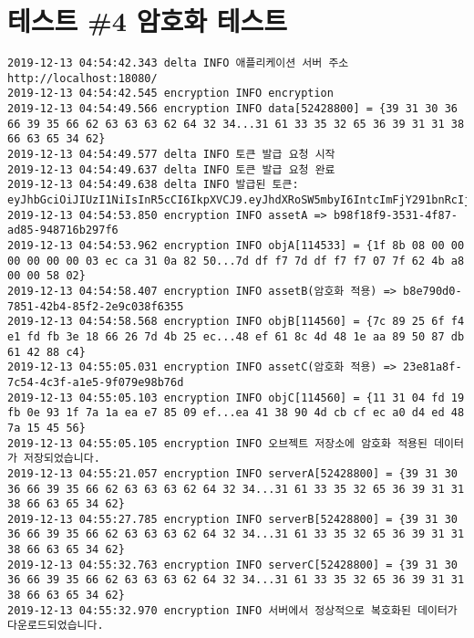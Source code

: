 \section{테스트 \#4 암호화 테스트}
\begin{Verbatim}[fontsize=\tiny, breaklines=true, breakanywhere=true]
2019-12-13 04:54:42.343 delta INFO 애플리케이션 서버 주소 http://localhost:18080/
2019-12-13 04:54:42.545 encryption INFO encryption
2019-12-13 04:54:49.566 encryption INFO data[52428800] = {39 31 30 36 66 39 35 66 62 63 63 63 62 64 32 34...31 61 33 35 32 65 36 39 31 31 38 66 63 65 34 62}
2019-12-13 04:54:49.577 delta INFO 토큰 발급 요청 시작
2019-12-13 04:54:49.637 delta INFO 토큰 발급 요청 완료
2019-12-13 04:54:49.638 delta INFO 발급된 토큰: eyJhbGciOiJIUzI1NiIsInR5cCI6IkpXVCJ9.eyJhdXRoSW5mbyI6IntcImFjY291bnRcIjp7XCJpZFwiOjEsXCJ1c2VybmFtZVwiOlwiRGVmYXVsdEFkbWluVXNlclwifSxcInJvbGVcIjpcIkFkbWluXCJ9IiwianRpIjoiMmNjNGVkZTVkMDk4NWJjNTkwYzAxYTlmZDcxNDQ3ODYyZDU3NzM2NjBlODNmMzgzYjA3Y2EyM2I5OWNkYmU1OSIsImlzcyI6IkRlbHRhLkFwcFNlcnZlciIsImF1ZCI6IkRlbHRhLkFwcFNlcnZlciJ9.eJ1rJKCuK_haDdI2jcUgsmyyWrU1CXdaylb6bsuPcRc
2019-12-13 04:54:53.850 encryption INFO assetA => b98f18f9-3531-4f87-ad85-948716b297f6
2019-12-13 04:54:53.962 encryption INFO objA[114533] = {1f 8b 08 00 00 00 00 00 00 03 ec ca 31 0a 82 50...7d df f7 7d df f7 f7 07 7f 62 4b a8 00 00 58 02}
2019-12-13 04:54:58.407 encryption INFO assetB(암호화 적용) => b8e790d0-7851-42b4-85f2-2e9c038f6355
2019-12-13 04:54:58.568 encryption INFO objB[114560] = {7c 89 25 6f f4 e1 fd fb 3e 18 66 26 7d 4b 25 ec...48 ef 61 8c 4d 48 1e aa 89 50 87 db 61 42 88 c4}
2019-12-13 04:55:05.031 encryption INFO assetC(암호화 적용) => 23e81a8f-7c54-4c3f-a1e5-9f079e98b76d
2019-12-13 04:55:05.103 encryption INFO objC[114560] = {11 31 04 fd 19 fb 0e 93 1f 7a 1a ea e7 85 09 ef...ea 41 38 90 4d cb cf ec a0 d4 ed 48 7a 15 45 56}
2019-12-13 04:55:05.105 encryption INFO 오브젝트 저장소에 암호화 적용된 데이터가 저장되었습니다.
2019-12-13 04:55:21.057 encryption INFO serverA[52428800] = {39 31 30 36 66 39 35 66 62 63 63 63 62 64 32 34...31 61 33 35 32 65 36 39 31 31 38 66 63 65 34 62}
2019-12-13 04:55:27.785 encryption INFO serverB[52428800] = {39 31 30 36 66 39 35 66 62 63 63 63 62 64 32 34...31 61 33 35 32 65 36 39 31 31 38 66 63 65 34 62}
2019-12-13 04:55:32.763 encryption INFO serverC[52428800] = {39 31 30 36 66 39 35 66 62 63 63 63 62 64 32 34...31 61 33 35 32 65 36 39 31 31 38 66 63 65 34 62}
2019-12-13 04:55:32.970 encryption INFO 서버에서 정상적으로 복호화된 데이터가 다운로드되었습니다.    
\end{Verbatim}